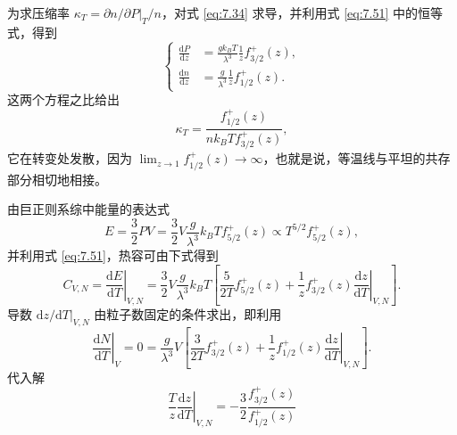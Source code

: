 为求压缩率 $\kappa_T=\left.\partial n/\partial P\right|_T/n$，对式 \eqref{eq:7.34} 求导，并利用式 \eqref{eq:7.51} 中的恒等式，得到
\begin{equation}\label{eq:7.60}
\left\{\begin{aligned}
\frac{\mathrm dP}{\mathrm dz}&=\frac{gk_BT}{\lambda^3}\frac1zf_{3/2}^+(z),\\[1ex]
\frac{\mathrm dn}{\mathrm dz}&=\frac g{\lambda^3}\frac1zf_{1/2}^+(z).
\end{aligned}\right.
\end{equation}
这两个方程之比给出
\begin{equation}\label{eq:7.61}
\kappa_T=\frac{f_{1/2}^+(z)}{nk_BTf_{3/2}^+(z)},
\end{equation}
它在转变处发散，因为 $\lim_{z\to1}f_{1/2}^+(z)\to\infty$，也就是说，等温线与平坦的共存部分相切地相接。

由巨正则系综中能量的表达式
\begin{equation}\label{eq:7.62}
E=\frac32PV=\frac32V\frac g{\lambda^3}k_BTf_{5/2}^+(z)\propto T^{5/2}f_{5/2}^+(z),
\end{equation}
并利用式 \eqref{eq:7.51}，热容可由下式得到
\begin{equation}\label{eq:7.63}
C_{V,N}=\left.\frac{\mathrm dE}{\mathrm dT}\right|_{V,N}=\frac32V\frac g{\lambda^3}k_BT\left[\frac5{2T}f_{5/2}^+(z)+\frac1zf_{3/2}^+(z)\left.\frac{\mathrm dz}{\mathrm dT}\right|_{V,N}\right].
\end{equation}
导数 $\left.\mathrm dz/\mathrm dT\right|_{V,N}$ 由粒子数固定的条件求出，即利用
\begin{equation}\label{eq:7.64}
\left.\frac{\mathrm dN}{\mathrm dT}\right|_V=0=\frac g{\lambda^3}V\left[\frac3{2T}f_{3/2}^+(z)+\frac1zf_{1/2}^+(z)\left.\frac{\mathrm dz}{\mathrm dT}\right|_{V,N}\right].
\end{equation}
代入解
\begin{equation*}
\frac Tz\left.\frac{\mathrm dz}{\mathrm dT}\right|_{V,N}=-\frac32\frac{f_{3/2}^+(z)}{f_{1/2}^+(z)}
\end{equation*}



